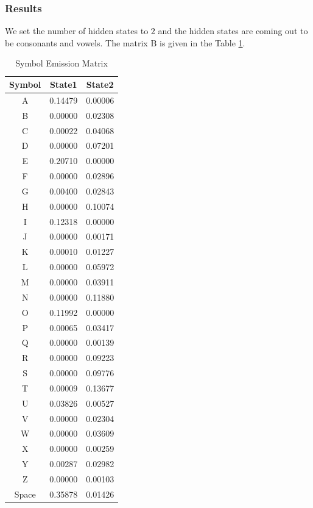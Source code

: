 \documentclass[journal, compsoc]{IEEEtran}
\begin{document}
\subsubsection{Results}
We set the number of hidden states to $2$ and the hidden states are coming out to be consonants and vowels. The matrix B is given in the Table \ref{table:B}.
\begin{table}
\renewcommand{\arraystretch}{0.4}
\caption{Symbol Emission Matrix}
\label{table:B}
\centering
\begin{tabular}{|c|c|c|}
\hline
{\bfseries Symbol} & {\bfseries State1} & {\bfseries State2}\\
\hline\hline
A & 0.14479 & 0.00006\\
\hline
B & 0.00000 & 0.02308\\
\hline
C & 0.00022 & 0.04068\\
\hline
D & 0.00000 & 0.07201\\
\hline
E & 0.20710 & 0.00000\\
\hline
F & 0.00000 & 0.02896\\
\hline
G & 0.00400 & 0.02843\\
\hline
H & 0.00000 & 0.10074\\
\hline
I & 0.12318 & 0.00000\\
\hline
J & 0.00000 & 0.00171\\
\hline
K & 0.00010 & 0.01227\\
\hline
L & 0.00000 & 0.05972\\
\hline
M & 0.00000 & 0.03911\\
\hline
N & 0.00000 & 0.11880\\
\hline
O & 0.11992 & 0.00000\\
\hline
P & 0.00065 & 0.03417\\
\hline
Q & 0.00000 & 0.00139\\
\hline
R & 0.00000 & 0.09223\\
\hline
S & 0.00000 & 0.09776\\
\hline
T & 0.00009 & 0.13677\\
\hline
U & 0.03826 & 0.00527\\
\hline
V & 0.00000 & 0.02304\\
\hline
W & 0.00000 & 0.03609\\
\hline
X & 0.00000 & 0.00259\\
\hline
Y & 0.00287 & 0.02982\\
\hline
Z & 0.00000 & 0.00103\\
\hline
Space & 0.35878 & 0.01426\\
\hline
\end{tabular}
\end{table}
\end{document}
